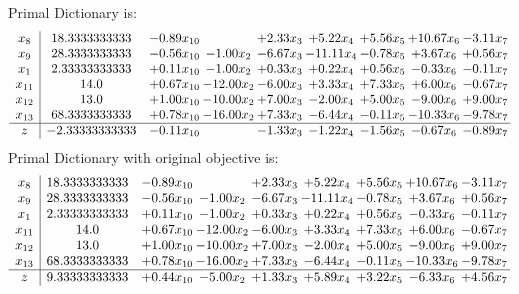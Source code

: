 \documentclass[8pt]{article}
\begin{document}
Primal Dictionary is:
\[\begin{array}{c| c c@{\hskip 2pt} c@{\hskip 2pt} c@{\hskip 2pt} c@{\hskip 2pt} c@{\hskip 2pt} c@{\hskip 2pt} c@{\hskip 2pt} }
 x_{8}   &  18.3333333333 & -0.89 x_{10} &   & +  2.33 x_{3} & +  5.22 x_{4} & +  5.56 x_{5} & + 10.67 x_{6} & -3.11 x_{7}\\
 x_{9}   &  28.3333333333 & -0.56 x_{10} & -1.00 x_{2} & -6.67 x_{3} & -11.11 x_{4} & -0.78 x_{5} & +  3.67 x_{6} & +  0.56 x_{7}\\
 x_{1}   &  2.33333333333 & +  0.11 x_{10} & -1.00 x_{2} & +  0.33 x_{3} & +  0.22 x_{4} & +  0.56 x_{5} & -0.33 x_{6} & -0.11 x_{7}\\
 x_{11}   &  14.0 & +  0.67 x_{10} & -12.00 x_{2} & -6.00 x_{3} & +  3.33 x_{4} & +  7.33 x_{5} & +  6.00 x_{6} & -0.67 x_{7}\\
 x_{12}   &  13.0 & +  1.00 x_{10} & -10.00 x_{2} & +  7.00 x_{3} & -2.00 x_{4} & +  5.00 x_{5} & -9.00 x_{6} & +  9.00 x_{7}\\
 x_{13}   &  68.3333333333 & +  0.78 x_{10} & -16.00 x_{2} & +  7.33 x_{3} & -6.44 x_{4} & -0.11 x_{5} & -10.33 x_{6} & -9.78 x_{7}\\
\hline
z    &  -2.33333333333 & -0.11 x_{10} &   & -1.33 x_{3} & -1.22 x_{4} & -1.56 x_{5} & -0.67 x_{6} & -0.89 x_{7}\\
\end{array}\]
Primal Dictionary with original objective is:
\[\begin{array}{c| c c@{\hskip 2pt} c@{\hskip 2pt} c@{\hskip 2pt} c@{\hskip 2pt} c@{\hskip 2pt} c@{\hskip 2pt} c@{\hskip 2pt} }
 x_{8}   &  18.3333333333 & -0.89 x_{10} &   & +  2.33 x_{3} & +  5.22 x_{4} & +  5.56 x_{5} & + 10.67 x_{6} & -3.11 x_{7}\\
 x_{9}   &  28.3333333333 & -0.56 x_{10} & -1.00 x_{2} & -6.67 x_{3} & -11.11 x_{4} & -0.78 x_{5} & +  3.67 x_{6} & +  0.56 x_{7}\\
 x_{1}   &  2.33333333333 & +  0.11 x_{10} & -1.00 x_{2} & +  0.33 x_{3} & +  0.22 x_{4} & +  0.56 x_{5} & -0.33 x_{6} & -0.11 x_{7}\\
 x_{11}   &  14.0 & +  0.67 x_{10} & -12.00 x_{2} & -6.00 x_{3} & +  3.33 x_{4} & +  7.33 x_{5} & +  6.00 x_{6} & -0.67 x_{7}\\
 x_{12}   &  13.0 & +  1.00 x_{10} & -10.00 x_{2} & +  7.00 x_{3} & -2.00 x_{4} & +  5.00 x_{5} & -9.00 x_{6} & +  9.00 x_{7}\\
 x_{13}   &  68.3333333333 & +  0.78 x_{10} & -16.00 x_{2} & +  7.33 x_{3} & -6.44 x_{4} & -0.11 x_{5} & -10.33 x_{6} & -9.78 x_{7}\\
\hline
z    &  9.33333333333 & +  0.44 x_{10} & -5.00 x_{2} & +  1.33 x_{3} & +  5.89 x_{4} & +  3.22 x_{5} & -6.33 x_{6} & +  4.56 x_{7}\\
\end{array}\]
\end{document}
